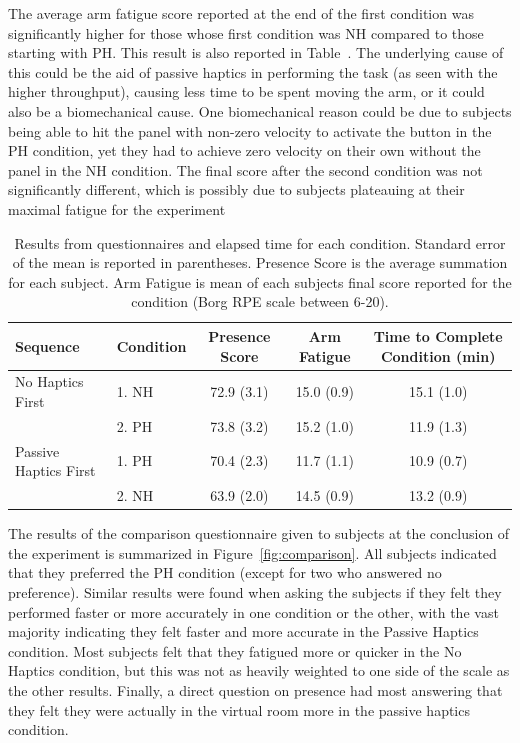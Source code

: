 \documentclass[]{aiaa-tc}%
\begin{document}
The average arm fatigue score reported at the end of the first condition was significantly higher for those whose first condition was NH compared to those starting with PH.
This result is also reported in Table~\cite{tab:subjective}.
The underlying cause of this could be the aid of passive haptics in performing the task (as seen with the higher throughput), causing less time to be spent moving the arm, or it could also be a biomechanical cause.
One biomechanical reason could be due to subjects being able to hit the panel with non-zero velocity to activate the button in the PH condition, yet they had to achieve zero velocity on their own without the panel in the NH condition.
The final score after the second condition was not significantly different, which is possibly due to subjects plateauing at their maximal fatigue for the experiment

\begin{table}
  \centering
  \begin{tabular}{llccc}
    Sequence & Condition & Presence Score & Arm Fatigue & Time to Complete Condition (min) \\
    \hline\hline
    No Haptics First & 1. NH & 72.9 (3.1) & 15.0 (0.9) & 15.1 (1.0) \\
    & 2. PH & 73.8 (3.2) & 15.2 (1.0) & 11.9 (1.3) \\
    \hline
    Passive Haptics First & 1. PH & 70.4 (2.3) & 11.7 (1.1) & 10.9 (0.7) \\
    & 2. NH & 63.9 (2.0) & 14.5 (0.9) & 13.2 (0.9) \\
  \end{tabular}
  \caption{Results from questionnaires and elapsed time for each condition. Standard error of the mean is reported in parentheses. Presence Score is the average summation for each subject. Arm Fatigue is mean of each subjects final score reported for the condition (Borg RPE scale between 6-20).}
  \label{tab:subjective}
\end{table}

The results of the comparison questionnaire given to subjects at the conclusion of the experiment is summarized in Figure~\ref{fig:comparison}.
All subjects indicated that they preferred the PH condition (except for two who answered no preference).
Similar results were found when asking the subjects if they felt they performed faster or more accurately in one condition or the other, with the vast majority indicating they felt faster and more accurate in the Passive Haptics condition.
Most subjects felt that they fatigued more or quicker in the No Haptics condition, but this was not as heavily weighted to one side of the scale as the other results.
Finally, a direct question on presence had most answering that they felt they were actually in the virtual room more in the passive haptics condition.
\end{document}
